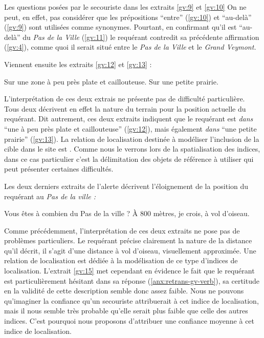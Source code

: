 Les questions posées par le secouriste dans les extraits \ref{gv:9} et
\ref{gv:10}
%
On ne peut, en effet, pas considérer que les prépositions
\enquote{entre} (\ref{gv:10}) et \enquote{au-delà} (\ref{gv:9}) sont
utilisées comme synonymes.
%
Pourtant, en confirmant qu'il est \enquote{au-delà} du \emph{Pas de la
  Ville} (\ref{gv:11}) le requérant contredit sa précédente
affirmation (\ref{gv:4}), comme quoi il serait situé entre le
\emph{Pas de la Ville} et le \emph{Grand Veymont.}

Viennent ensuite les extraits \ref{gv:12} et \ref{gv:13} :
%
\begin{dialogue*}
  \Req {} Sur une zone à peu près plate et
  caillouteuse.  Sur une petite prairie.
\end{dialogue*}
%
L'interprétation de ces deux extrais ne présente pas de difficulté
particulière. Tous deux décrivent en effet la nature du terrain pour
la position actuelle du requérant. Dit autrement, ces deux extraits
indiquent que le requérant est \emph{dans} \enquote{une à peu près
  plate et caillouteuse} (\ref{gv:12}), mais également \emph{dans}
\enquote{une petite prairie} (\ref{gv:13}). La relation de
localisation destinée à modéliser l'inclusion de la cible dans le site
est . Comme nous le verrons lors de la
spatialisation des indices, dans ce cas particulier c'est la
délimitation des objets de référence à utiliser qui peut présenter
certaines difficultés.

Les deux derniers extraits de l'alerte décrivent l'éloignement de la
position du requérant au \emph{Pas de la ville :}
%
\begin{dialogue*}
  \Sec {} Vous êtes à combien du Pas de la ville ?
  \Req {} À 800 mètres, je crois, à vol d'oiseau.
\end{dialogue*}
%
Comme précédemment, l'interprétation de ces deux extraits ne pose pas
de problèmes particuliers. Le requérant précise clairement la nature
de la distance qu'il décrit, il s'agit d'une distance à vol d'oiseau,
visuellement approximée. Une relation de localisation
 est dédiée à
la modélisation de ce type d'indices de localisation. L'extrait
\ref{gv:15} met cependant en évidence le fait que le requérant est
particulièrement hésitant dans sa réponse
(\autoref{anx:retrans-gv-verb}), sa certitude en la validité de cette
description semble donc assez faible. Nous ne pouvons qu'imaginer la
confiance qu'un secouriste attribuerait à cet indice de localisation,
mais il nous semble très probable qu'elle serait plus faible que celle
des autres indices. C'est pourquoi nous proposons d'attribuer une
confiance moyenne à cet indice de localisation.



